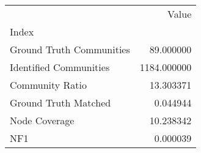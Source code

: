 \begin{tabular}{lr}
\toprule
{} &        Value \\
Index                    &              \\
\midrule
Ground Truth Communities &    89.000000 \\
Identified Communities   &  1184.000000 \\
Community Ratio          &    13.303371 \\
Ground Truth Matched     &     0.044944 \\
Node Coverage            &    10.238342 \\
NF1                      &     0.000039 \\
\bottomrule
\end{tabular}
